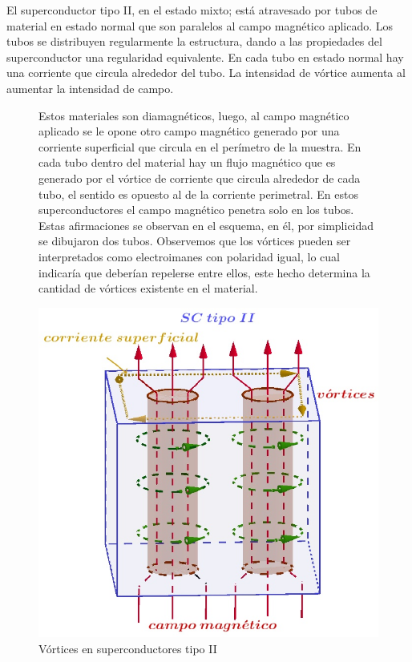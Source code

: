 El superconductor tipo II, en el estado mixto; está atravesado por tubos de material en estado normal que son paralelos al campo magnético aplicado. Los tubos se distribuyen regularmente la estructura, dando a las propiedades del superconductor una regularidad equivalente. En cada tubo en estado normal hay una corriente que circula alrededor del tubo. La intensidad de vórtice aumenta al aumentar la intensidad de campo.


\begin{figure}[H]
  \begin{minipage}[b]{0.47\textwidth}
  Estos materiales son diamagnéticos, luego, al campo magnético aplicado se le opone otro campo magnético generado por una corriente superficial que circula en el perímetro de la muestra. En cada tubo dentro del material hay un flujo magnético que es generado por el vórtice de corriente que circula alrededor de cada tubo, el sentido es opuesto al de la corriente perimetral. En estos superconductores el campo magnético penetra solo en los tubos. Estas afirmaciones se observan en el esquema, en él, por simplicidad se dibujaron dos tubos. Observemos que los vórtices pueden ser interpretados como electroimanes con polaridad igual, lo cual indicaría que deberían repelerse entre ellos, este hecho determina la cantidad de vórtices existente en el material.
  \vspace{0.0cm}
  \end{minipage}
  \hfill
  \begin{minipage}[b]{0.47\textwidth}
     \includegraphics[width=1.10\textwidth]{./Figures/fig421}
     \caption{Vórtices en superconductores tipo II}
	\label{fig:421}
  \end{minipage}
\end{figure}

